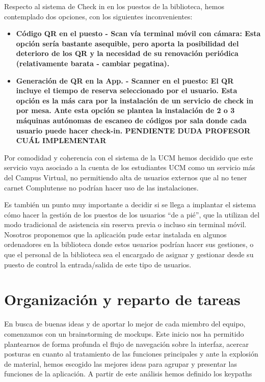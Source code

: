 \documentclass[12pt]{article}
\begin{document}
Respecto al sistema de Check in en los puestos de la biblioteca, hemos contemplado dos opciones, con los siguientes inconvenientes:

\begin{itemize}
\item \textbf{Código QR en el puesto - Scan vía terminal móvil con cámara: Esta opción sería bastante asequible, pero aporta la posibilidad del deterioro de los QR y la necesidad de su renovación periódica (relativamente barata - cambiar pegatina).}

\item \textbf{Generación de QR en la App. - Scanner en el puesto: El QR incluye el tiempo de reserva seleccionado por el usuario. Esta opción es la más cara por la instalación de un servicio de check in por mesa. Ante esta opción se plantea la instalación de 2 o 3 máquinas autónomas de escaneo de códigos por sala donde cada usuario puede hacer check-in. PENDIENTE DUDA PROFESOR CUÁL IMPLEMENTAR}
\end{itemize}

Por comodidad y coherencia con el sistema de la UCM hemos decidido que este servicio vaya asociado a la cuenta de los estudiantes UCM como un servicio más del Campus Virtual, no permitiendo alta de usuarios externos que al no tener carnet Complutense no podrían hacer uso de las instalaciones.

Es también un punto muy importante a decidir si se llega a implantar el sistema cómo hacer la gestión de los puestos de los usuarios “de a pié”, que la utilizan del modo tradicional de asistencia sin reserva previa o incluso sin terminal móvil. Nosotros proponemos que la aplicación pude estar instalada en algunos ordenadores en la biblioteca donde estos usuarios podrían hacer sus gestiones, o que el personal de la biblioteca sea el encargado de asignar y gestionar desde su puesto de control la entrada/salida de este tipo de usuarios.



\section{Organización y reparto de tareas}
En busca de buenas ideas y de aportar lo mejor de cada miembro del equipo, comenzamos con un brainstorming de mockups. Este inicio nos ha permitido plantearnos de forma profunda el flujo de navegación sobre la interfaz, acercar posturas en cuanto al tratamiento de las funciones principales y ante la explosión de material, hemos escogido las mejores ideas para agrupar y presentar las funciones de la aplicación. A partir de este análisis hemos definido los keypaths 
\end{document}
